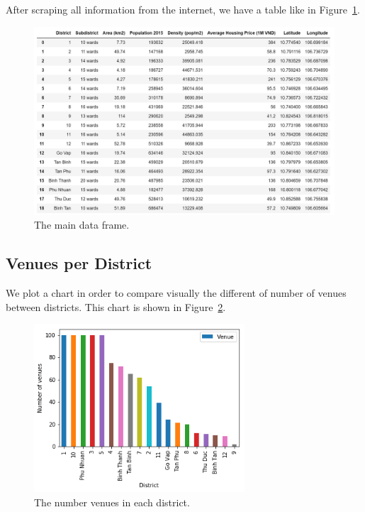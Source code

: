 \documentclass[12pt,a4paper]{article}
\begin{document}
After scraping all information from the internet, we have a table like in Figure~\ref{fig:df}.

\begin{center}
    \begin{figure}[htp]
    \begin{center}
     \includegraphics[width=\textwidth]{fig/df}
    \end{center}
    \caption{The main data frame.}
    \label{fig:df}
    \end{figure}
\end{center}

\subsection{Venues per  District}

We plot a chart in order to compare visually the different of number of venues between districts. This chart is shown in Figure~\ref{fig:ve-per-dis}.

\begin{center}
    \begin{figure}[htp]
    \begin{center}
     \includegraphics[width=0.7\textwidth]{fig/venues-per-district}
    \end{center}
    \caption{The number venues in each district.}
    \label{fig:ve-per-dis}
    \end{figure}
\end{center}
\end{document}
